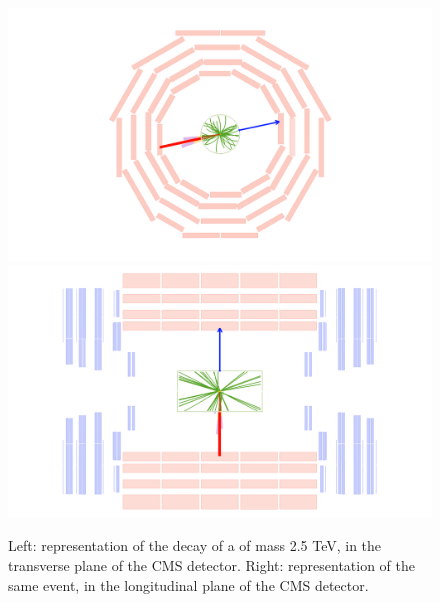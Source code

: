\begin{figure}[!htb]
  \centering
    \includegraphics[width=.5\textwidth]{evdisp/Wprime25Tev_rhophi_all.png}%
    \includegraphics[width=.5\textwidth]{evdisp/Wprime25Tev_rhoz_all.png}%

  \caption{Left: representation of the decay of a \Wp of mass 2.5 TeV, in the transverse plane of the CMS detector. Right: representation of the same event, in the longitudinal plane of the CMS detector.}
  \label{fig:event_display}
\end{figure}
